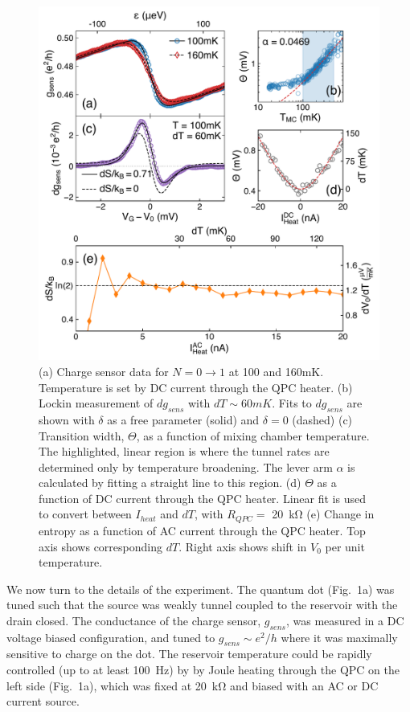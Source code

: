 \documentclass[preprint,showpacs,preprintnumbers,amsmath,amssymb,pra,aps,superscriptaddress]{revtex4-1}
\begin{document}


\begin{figure}[!]
        \includegraphics[width=1.0\columnwidth]{../figures/figure_2.pdf}
        \caption{\label{fig:fig2}(a) Charge sensor data for $N=0 \rightarrow 1$ at 100 and 160mK. Temperature is set by DC current through the QPC heater. (b) Lockin measurement of $dg_{sens}$ with $dT \sim 60mK$. Fits to $dg_{sens}$ are shown with $\delta$ as a free parameter (solid) and $\delta=0$ (dashed) (c) Transition width, $\Theta$, as a function of mixing chamber temperature. The highlighted, linear region is where the tunnel rates are determined only by temperature broadening. The lever arm $\alpha$ is calculated by fitting a straight line to this region. (d) $\Theta$ as a function of DC current through the QPC heater. Linear fit is used to convert between $I_{heat}$ and $dT$, with $R_{QPC} = $ \SI{20}{\kilo\ohm} (e) Change in entropy as a function of AC current through the QPC heater. Top axis shows corresponding $dT$. Right axis shows shift in $V_0$ per unit temperature.}
\end{figure}

We now turn to the details of the experiment.  The quantum dot (Fig.~1a) was tuned such that the source was weakly tunnel coupled to the reservoir with the drain closed. The conductance of the charge sensor,  $g_{sens}$, was measured in a DC voltage biased configuration, and tuned to $g_{sens}{\sim}e^2/h$ where it was maximally sensitive to charge on the dot.  The reservoir temperature could be rapidly controlled (up to at least  \SI{100}{\hertz}) by by Joule heating through the QPC on the left side (Fig.~1a), which was fixed at \SI{20}{\kilo\ohm} and biased with an AC or DC current source.
\end{document}

